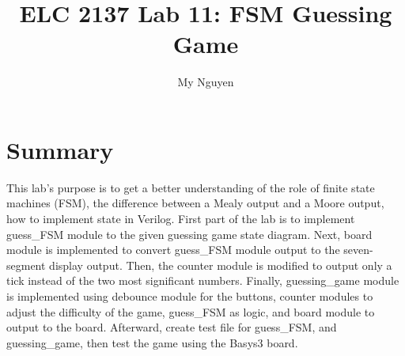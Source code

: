 \documentclass[11pt]{article}
\begin{document}
\title{ELC 2137 Lab 11: FSM Guessing Game}
\author{My Nguyen}

\maketitle

\section*{Summary}
This lab's purpose is to get a better understanding of the role of finite state machines (FSM), the difference between a Mealy output and a Moore output, how to implement state in Verilog. First part of the lab is to implement guess\_FSM module to the given guessing game state diagram. Next, board module is implemented to convert guess\_FSM module output to the seven-segment display output. Then, the counter module is modified to output only a tick instead of the two most significant numbers. Finally, guessing\_game module is implemented using debounce module for the buttons, counter modules to adjust the difficulty of the game, guess\_FSM as logic, and board module to output to the board. Afterward, create test file for guess\_FSM, and guessing\_game, then test the game using the Basys3 board.
\end{document}
